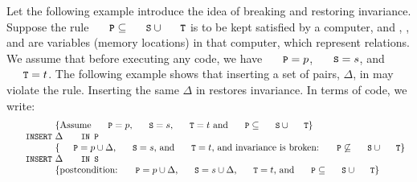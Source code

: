 \documentclass{svproc}
\begin{document}
	Let the following example introduce the idea of breaking and restoring invariance.
	Suppose the rule $\code{P}\subs\code{S}\cup\code{T}$ is to be kept satisfied by a computer,
	and , , and  are variables (memory locations) in that computer,
	which represent relations.
	We assume that before executing any code, we have $\code{P}=p$, $\code{S}=s$, and $\code{T}=t$.
	The following example shows that inserting a set of pairs, $\Delta$, in 
	may violate the rule.
	Inserting the same $\Delta$ in  restores invariance.
	In terms of code, we write:
\[\begin{array}{r@{~}l}
&\{\text{Assume $\code{P}=p$, $\code{S}=s$, $\code{T}=t$ and $\code{P}\subs\code{S}\cup\code{T}$}\}\\
\code{INSERT}&\Delta\code{ IN P}\\
&\{\text{$\code{P}=p\cup\Delta$, $\code{S}=s$, and $\code{T}=t$, and invariance is broken: $\code{P}\not\subs\code{S}\cup\code{T}$}\}\\
\code{INSERT}&\Delta\code{ IN S}\\
&\{\text{postcondition: $\code{P}=p\cup\Delta$, $\code{S}=s\cup\Delta$, $\code{T}=t$, and $\code{P}\subs\code{S}\cup\code{T}$}\}\\
\end{array}\]
	
\end{document}
